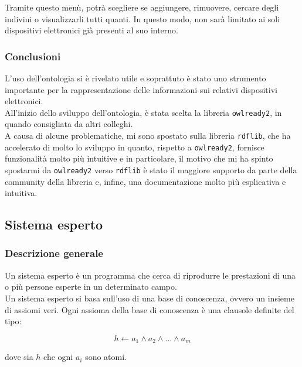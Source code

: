 \documentclass[12pt, letterpaper]{article}
\begin{document}
\noindent Tramite questo menù, potrà scegliere se aggiungere, rimuovere, cercare degli indiviui o visualizzarli
tutti quanti. In questo modo, non sarà limitato ai soli dispositivi elettronici già presenti al suo interno.

\subsubsection{Conclusioni}

\noindent L'uso dell'ontologia si è rivelato utile e soprattuto è stato uno strumento importante per la rappresentazione
delle informazioni sui relativi dispositivi elettronici. \\

\noindent All'inizio dello sviluppo dell'ontologia, è stata scelta la libreria \texttt{owlready2}, in
quando consigliata da altri colleghi. \\

\noindent A causa di alcune problematiche, mi sono spostato sulla libreria \texttt{rdflib}, che ha
accelerato di molto lo sviluppo in quanto, rispetto a \texttt{owlready2}, fornisce
funzionalità molto più intuitive e in particolare, il motivo che mi ha spinto spostarmi da
\texttt{owlready2} verso \texttt{rdflib} è stato il maggiore supporto da
parte della community della libreria e, infine, una documentazione
molto più esplicativa e intuitiva. \\

\subsection{Sistema esperto}

\subsubsection{Descrizione generale}

\noindent Un sistema esperto è un programma che cerca di riprodurre le prestazioni di una o più
persone esperte in un determinato campo. \\

\noindent Un sistema esperto si basa sull'uso di una base di conoscenza, ovvero un insieme
di assiomi veri. Ogni assioma della base di conoscenza è una clausole definite del tipo:

\[ h \leftarrow a_1 \land  a_2 \land \dots \land a_m \]

\noindent dove sia $h$ che ogni $a_i$ sono atomi.
\end{document}
